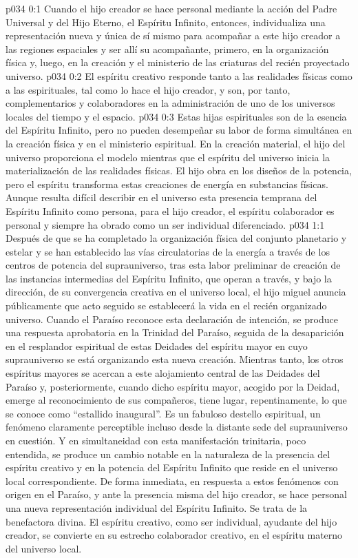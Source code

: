 \author{Mensajero poderoso}
\vs p034 0:1 Cuando el hijo creador se hace personal mediante la acción del Padre Universal y del Hijo Eterno, el Espíritu Infinito, entonces, individualiza una representación nueva y única de sí mismo para acompañar a este hijo creador a las regiones espaciales y ser allí su acompañante, primero, en la organización física y, luego, en la creación y el ministerio de las criaturas del recién proyectado universo.
\vs p034 0:2 El espíritu creativo responde tanto a las realidades físicas como a las espirituales, tal como lo hace el hijo creador, y son, por tanto, complementarios y colaboradores en la administración de uno de los universos locales del tiempo y el espacio.
\vs p034 0:3 Estas hijas espirituales son de la esencia del Espíritu Infinito, pero no pueden desempeñar su labor de forma simultánea en la creación física y en el ministerio espiritual. En la creación material, el hijo del universo proporciona el modelo mientras que el espíritu del universo inicia la materialización de las realidades físicas. El hijo obra en los diseños de la potencia, pero el espíritu transforma estas creaciones de energía en substancias físicas. Aunque resulta difícil describir en el universo esta presencia temprana del Espíritu Infinito como persona, para el hijo creador, el espíritu colaborador es personal y siempre ha obrado como un ser individual diferenciado.
\vs p034 1:1 Después de que se ha completado la organización física del conjunto planetario y estelar y se han establecido las vías circulatorias de la energía a través de los centros de potencia del suprauniverso, tras esta labor preliminar de creación de las instancias intermedias del Espíritu Infinito, que operan a través, y bajo la dirección, de su convergencia creativa en el universo local, el hijo miguel anuncia públicamente que acto seguido se establecerá la vida en el recién organizado universo. Cuando el Paraíso reconoce esta declaración de intención, se produce una respuesta aprobatoria en la Trinidad del Paraíso, seguida de la desaparición en el resplandor espiritual de estas Deidades del espíritu mayor en cuyo suprauniverso se está organizando esta nueva creación. Mientras tanto, los otros espíritus mayores se acercan a este alojamiento central de las Deidades del Paraíso y, posteriormente, cuando dicho espíritu mayor, acogido por la Deidad, emerge al reconocimiento de sus compañeros, tiene lugar, repentinamente, lo que se conoce como “estallido inaugural”. Es un fabuloso destello espiritual, un fenómeno claramente perceptible incluso desde la distante sede del suprauniverso en cuestión. Y en simultaneidad con esta manifestación trinitaria, poco entendida, se produce un cambio notable en la naturaleza de la presencia del espíritu creativo y en la potencia del Espíritu Infinito que reside en el universo local correspondiente. De forma inmediata, en respuesta a estos fenómenos con origen en el Paraíso, y ante la presencia misma del hijo creador, se hace personal una nueva representación individual del Espíritu Infinito. Se trata de la benefactora divina. El espíritu creativo, como ser individual, ayudante del hijo creador, se convierte en su estrecho colaborador creativo, en el espíritu materno del universo local.
